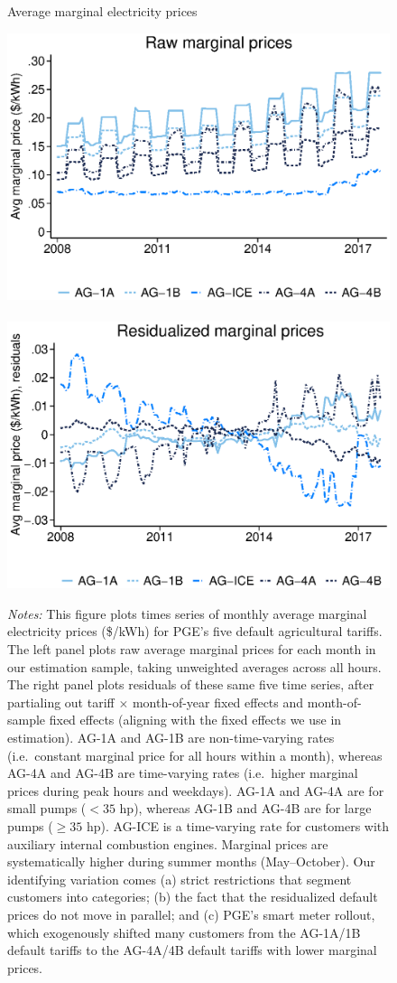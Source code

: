 \vspace{35mm}
\begin{figure}[h!]\centering
\captionsetup{width=\textwidth}
\caption{Average marginal electricity prices}
\label{fig:marg_price_5_default_rates}
\vspace{-2mm}
{\includegraphics[width=.495\textwidth]{figures/marg_price_5_default_rates_raw.eps}}~
{\includegraphics[width=.495\textwidth]{figures/marg_price_5_default_rates_resid.eps}}
\\
\captionsetup{width=\textwidth}
\caption*{\scriptsize \emph{Notes:} This figure plots times series of monthly average marginal electricity prices (\$/kWh) for PGE's five default agricultural tariffs. The left panel plots raw average marginal prices for each month in our estimation sample, taking unweighted averages across all hours. The right panel plots residuals of these same five time series, after partialing out tariff $\times$ month-of-year fixed effects and month-of-sample fixed effects (aligning with the fixed effects we use in estimation). AG-1A and AG-1B are non-time-varying rates (i.e.\ constant marginal price for all hours within a month), whereas AG-4A and AG-4B are time-varying rates (i.e.\ higher marginal prices during peak hours and weekdays). AG-1A and AG-4A are for small pumps ($<35$ hp), whereas AG-1B and AG-4B are for large pumps ($\ge35$ hp). AG-ICE is a time-varying rate for customers with auxiliary internal combustion engines. Marginal prices are systematically higher during summer months (May--October). Our identifying variation comes (a) strict restrictions that segment customers into categories; (b) the fact that the residualized default prices do not move in parallel; and (c) PGE's smart meter rollout, which exogenously shifted many customers from the AG-1A/1B default tariffs to the AG-4A/4B default tariffs with lower marginal prices.}
\end{figure}